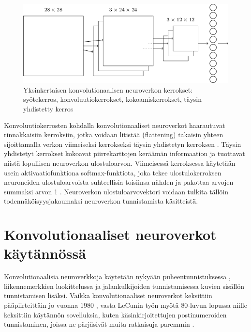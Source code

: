 \documentclass[finnish]{tktltiki2}
\theoremstyle{definition}
\theoremstyle{remark}
\begin{document}
    \begin{figure}[h]
      \centering
      \includegraphics[scale=0.5]{convnet-architecture}
      \caption{Yksinkertaisen konvolutionaalisen neuroverkon kerrokset: syötekerros, konvoluutiokerrokset, kokoamiskerrokset, täysin yhdistetty kerros \cite{Nielsen-neural}}
      \label{pic:convnet-architecture}
    \end{figure}
    Konvoluutiokerrosten kohdalla konvolutionaaliset neuroverkot haarautuvat rinnakkaisiin kerroksiin, jotka voidaan litistää (flattening) takaisin yhteen sijoittamalla verkon viimeiseksi kerrokseksi täysin yhdistetyn kerroksen \cite{Nielsen-neural}. Täysin yhdistetyt kerrokset kokoavat piirrekarttojen keräämän informaation ja tuottavat niistä lopullisen neuroverkon ulostuloarvon. Viimeisessä kerroksessa käytetään usein aktivaatiofunktiona softmax-funktiota, joka tekee ulostulokerroksen neuroneiden ulostuloarvoista suhteellisia toisiinsa nähden ja pakottaa arvojen summaksi arvon 1 \cite{Nielsen-neural}. Neuroverkon ulostuloarvovektori voidaan tulkita tällöin todennäköisyysjakaumaksi neuroverkon tunnistamista käsitteistä. 

  \section{Konvolutionaaliset neuroverkot käytännössä}
  Konvolutionaalisia neuroverkkoja käytetään nykyään puheentunnistuksessa \cite{abdel2012applying}, liikennemerkkien luokittelussa \cite{sermanet2011traffic} ja jalankulkijoiden tunnistamisessa \cite{szarvas2005pedestrian} kuvien sisällön tunnistamisen lisäksi. Vaikka konvolutionaaliset neuroverkot keksittiin pääpiirteittäin jo vuonna 1980 \cite{Fukushima1980}, vasta LeCunin työn myötä 80-luvun lopussa niille keksittiin käytännön sovelluksia, kuten käsinkirjoitettujen postinumeroiden tunnistaminen, joissa ne pärjäsivät muita ratkaisuja paremmin \cite{Lecun-et-al-1989-convnets}.
  
\end{document}
